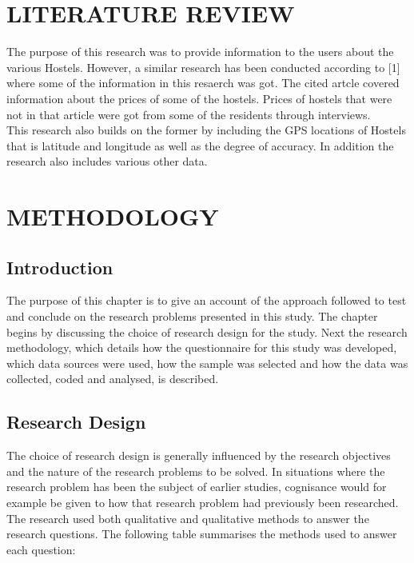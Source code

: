 \documentclass[12pt, a4paper]{article}
\begin{document}
\clearpage

\section{LITERATURE REVIEW}
The purpose of this research was to provide information to the users about the various Hostels. However, a similar research has been conducted according to [1] where some of the information in this resaerch was got. The cited artcle covered information about the prices of some of the hostels. Prices of hostels that were not in that article were got from some of the residents through interviews.\\
This research also builds on the former by including the GPS locations of Hostels that is latitude and longitude as well as the degree of accuracy. In addition the research also includes various other data.

\section{METHODOLOGY}
\subsection{Introduction}
The purpose of this chapter is to give an account of the approach followed to test and conclude on the research problems presented in this study. The chapter begins by discussing the choice of research design for the study. Next the research methodology, which details how the questionnaire for this study was developed, which data sources were used, how the sample was selected and how the data was collected, coded and analysed, is described.

\subsection{Research Design}
The choice of research design is generally influenced by the research objectives and the nature of the research problems to be solved.  In situations where the research problem has been the subject of earlier studies, cognisance would for example be given to how that research problem had previously been researched.\\
The research used both qualitative and qualitative methods to answer the research questions. The following table summarises the methods used to answer each question:
\end{document}
